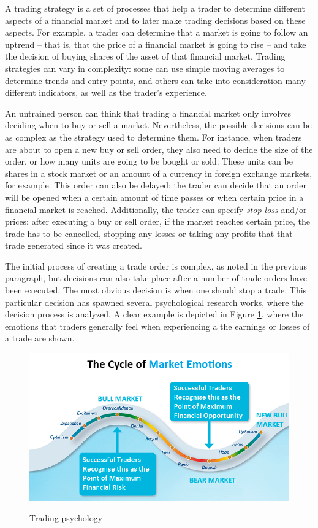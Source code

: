 A trading strategy is a set of processes that help a trader to determine
different aspects of a financial market and to later make trading decisions
based on these aspects. For example, a trader can determine that a market is
going to follow an uptrend -- that is, that the price of a financial market is
going to rise -- and take the decision of buying shares of the asset of that
financial market. Trading strategies can vary in complexity: some can use simple
moving averages to determine trends and entry points, and others can take into
consideration many different indicators, as well as the trader's experience.

An untrained person can think that trading a financial market only involves
deciding when to buy or sell a market. Nevertheless, the possible decisions can
be as complex as the strategy used to determine them. For instance, when traders
are about to open a new buy or sell order, they also need to decide the size of
the order, or how many units are going to be bought or sold. These units can be
shares in a stock market or an amount of a currency in foreign exchange markets,
for example. This order can also be delayed: the trader can decide that an order
will be opened when a certain amount of time passes or when certain price in a
financial market is reached. Additionally, the trader can specify \textit{stop
loss} and/or  prices: after executing a buy or sell order, if
the market reaches certain price, the trade has to be cancelled, stopping any
losses or taking any profits that that trade generated since it was created.

The initial process of creating a trade order is complex, as noted in the
previous paragraph, but decisions can also take place after a number of trade
orders have been executed. The most obvious decision is when one should stop a
trade. This particular decision has spawned several psychological research
works, where the decision process is analyzed. A clear example is depicted in
Figure \ref{figure:trading-psychology}, where the emotions that traders
generally feel when experiencing a the earnings or losses of a trade are shown.

\begin{figure}
\caption{Trading psychology}
\centering
\includegraphics[width=1.0\textwidth]{img/trading-psychology.png}
\label{figure:trading-psychology}
\end{figure}

